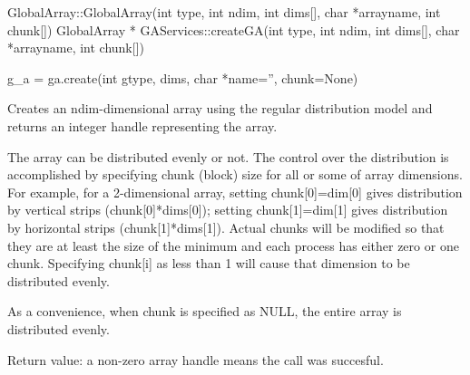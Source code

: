 \documentclass[12pt]{article}
\begin{document}
\begin{cxxapi}
\begin{cxxcode}
GlobalArray::GlobalArray(int type, int ndim, int dims[],
                         char *arrayname, int chunk[])
GlobalArray * GAServices::createGA(int type, int ndim, int dims[],
                                   char *arrayname, int chunk[])
\end{cxxcode}
\begin{funcargs}
\end{funcargs}
\end{cxxapi}

\begin{pyapi}
\begin{pycode}
g_a = ga.create(int gtype, dims, char *name='', chunk=None)
\end{pycode}
\begin{funcargs}
\end{funcargs}
\end{pyapi}

\dcoll

\begin{desc}

Creates an ndim-dimensional array using the regular distribution model and
returns an integer handle representing the array.

The array can be distributed evenly or not. The control over the distribution
is accomplished by specifying chunk (block) size for all or some of array
dimensions. For example, for a 2-dimensional array, setting chunk[0]=dim[0]
gives distribution by vertical strips (chunk[0]*dims[0]); setting
chunk[1]=dim[1] gives distribution by horizontal strips (chunk[1]*dims[1]).
Actual chunks will be modified so that they are at least the size of the
minimum and each process has either zero or one chunk. Specifying chunk[i] as
less than 1 will cause that dimension to be distributed evenly.

As a convenience, when chunk is specified as NULL, the entire array is
distributed evenly.

Return value: a non-zero array handle means the call was succesful.

\end{desc}
\end{document}
